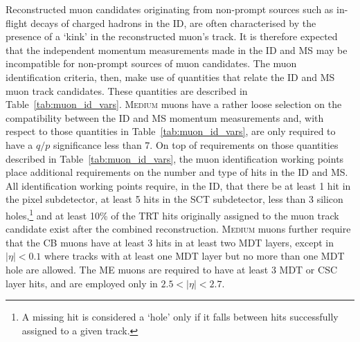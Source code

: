 Reconstructed muon candidates originating from non-prompt sources such
as in-flight decays of charged hadrons in the ID, are often characterised by the
presence of a `kink' in the reconstructed muon's track. It is therefore
expected that the independent momentum measurements made in the ID and MS may
be incompatible for non-prompt sources of muon candidates.
The muon identification criteria, then, make use of quantities
that relate the ID and MS muon track candidates.
These quantities are described in Table~\ref{tab:muon_id_vars}.
\textsc{Medium} muons have a rather loose selection on the compatibility between
the ID and MS momentum measurements and, with respect to those quantities in Table~\ref{tab:muon_id_vars},
are only required to have a $q/p$ significance less than 7.
On top of requirements on those quantities described in Table~\ref{tab:muon_id_vars},
the muon identification working points place
additional requirements on the number and type of hits in the ID and MS.
All identification working points require, in the ID, that there be at least 1 hit
in the pixel subdetector, at least 5 hits in the SCT subdetector, less
than 3 silicon holes,\footnote{A missing hit is considered a `hole' only
if it falls between hits successfully assigned to a given track.}
and at least 10\% of the TRT hits originally assigned to the muon track candidate exist
after the combined reconstruction.
\textsc{Medium} muons further require that the CB muons have at least 3 hits in at least
two MDT layers, except in $\lvert \eta \rvert < 0.1$ where tracks with at least one MDT layer but no more
than one MDT hole are allowed. The ME  muons are required to have at least
3 MDT or CSC layer hits, and are employed only in $2.5 < \lvert \eta \rvert < 2.7$.
{\color{red}{reference n MDT/CSC hits figure?}}


